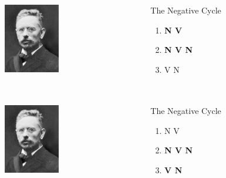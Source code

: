 \documentclass[compress]{beamer}
\begin{document}
\begin{frame}
\frametitle{\cite{jespersen:1917}}
\begin{columns}[T]  
   \begin{column}{.25\textwidth}
	  \includegraphics[height=1.2in]{jespersen.jpg}   
   \end{column}
   \begin{column}{.7\textwidth}
      \begin{block}{The Negative Cycle}
	\begin{enumerate}
	     \item \textbf{N V}
	     \item \textbf{N V N}
	     \item V N
	\end{enumerate}
      \end{block}
    \end{column}
  \end{columns}
\end{frame}

\begin{frame}
\frametitle{\cite{jespersen:1917}}
\begin{columns}[T]  
   \begin{column}{.25\textwidth}
	  \includegraphics[height=1.2in]{jespersen.jpg}   
   \end{column}
   \begin{column}{.7\textwidth}
      \begin{block}{The Negative Cycle}
	\begin{enumerate}
	     \item N V
	     \item \textbf{N V N}
	     \item \textbf{V N}
	\end{enumerate}
      \end{block}
    \end{column}
  \end{columns}
\end{frame}
\end{document}
